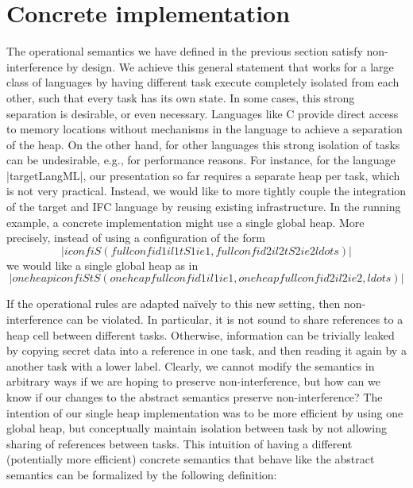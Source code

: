 \section{Concrete implementation}
\label{sec:concrete}

\newcommand{\con}[1]{\ensuremath{{\color{red} #1}}}
\newcommand{\abs}[1]{\ensuremath{{\color{blue} #1}}}

The operational semantics we have defined in the previous section
satisfy non-interference by design.
We achieve this general statement that works for a large class of
languages by having different task execute completely isolated from
each other, such that every task has its own state.
In some cases, this strong separation is desirable, or even necessary.
Languages like C provide direct access to memory locations without
mechanisms in the language to achieve a separation of the heap.
On the other hand, for other languages this
strong isolation of tasks can be
undesirable, e.g., for performance reasons.
For instance, for the language |targetLangML|, our presentation so far
requires a separate heap per task, which is not very practical.
Instead, we would like to
more tightly couple the integration of the target and IFC
language by reusing existing infrastructure.  In the running example,
a concrete implementation might use a single global heap.
More precisely, instead of using a configuration of the form
\[|iconf iS (fullconf id1 il1 tS1 ie1, fullconf id2 il2 tS2 ie2 ldots)|\]
we would like a single global heap as in
\[|oneheapiconf iS tS (oneheapfullconf id1 il1 ie1, oneheapfullconf id2 il2 ie2, ldots)|\]

If the operational rules are adapted na\"ively to this new setting,
then non-interference can be violated.  In particular, it is not
sound to share references to a heap cell between different tasks.
Otherwise, information can be trivially leaked by copying
secret data into a reference in one task, and then
reading it again by a another task with a lower label.
Clearly, we cannot
modify the semantics in arbitrary ways if we are hoping to preserve
non-interference, but how can we know if our changes to the abstract
semantics preserve non-interference?
The intention of our single heap implementation was to be more efficient
by using one global heap, but conceptually maintain isolation between
task by not allowing sharing of references between tasks.
This intuition of having a different (potentially more efficient)
concrete semantics that behave like the abstract semantics
can be formalized by the following definition:


